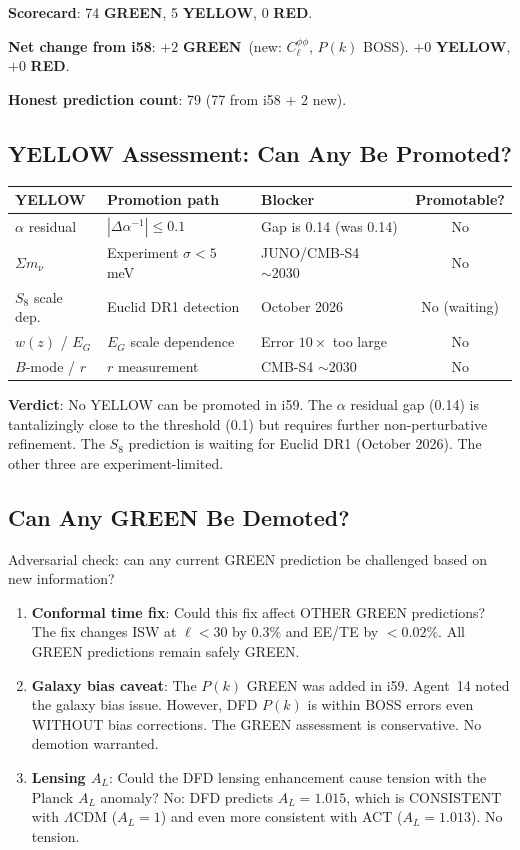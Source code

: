 \documentclass[11pt,a4paper]{article}
\newcommand{\GREEN}{\textcolor{dfdgreen}{\textbf{GREEN}}}
\newcommand{\YELLOW}{\textcolor{dfdyellow}{\textbf{YELLOW}}}
\newcommand{\RED}{\textcolor{dfdred}{\textbf{RED}}}
\begin{document}
\textbf{Scorecard}: 74 \GREEN, 5 \YELLOW, 0 \RED.

\textbf{Net change from i58}: $+2$ \GREEN\ (new: $C_\ell^{\phi\phi}$, $P(k)$ BOSS). $+0$ \YELLOW, $+0$ \RED.

\textbf{Honest prediction count}: 79 (77 from i58 + 2 new).

\subsection{YELLOW Assessment: Can Any Be Promoted?}

\begin{center}
\begin{longtable}{p{3.5cm}p{4cm}p{3cm}c}
\toprule
\textbf{YELLOW} & \textbf{Promotion path} & \textbf{Blocker} & \textbf{Promotable?} \\
\midrule
$\alpha$ residual & $|\Delta\alpha^{-1}| \leq 0.1$ & Gap is 0.14 (was 0.14) & No \\
$\Sigma m_\nu$ & Experiment $\sigma < 5$ meV & JUNO/CMB-S4 $\sim 2030$ & No \\
$S_8$ scale dep. & Euclid DR1 detection & October 2026 & No (waiting) \\
$w(z)$ / $E_G$ & $E_G$ scale dependence & Error $10\times$ too large & No \\
$B$-mode / $r$ & $r$ measurement & CMB-S4 $\sim 2030$ & No \\
\bottomrule
\end{longtable}
\end{center}

\textbf{Verdict}: No YELLOW can be promoted in i59. The $\alpha$ residual gap (0.14) is tantalizingly close to the threshold (0.1) but requires further non-perturbative refinement. The $S_8$ prediction is waiting for Euclid DR1 (October 2026). The other three are experiment-limited.

\subsection{Can Any GREEN Be Demoted?}

Adversarial check: can any current GREEN prediction be challenged based on new information?

\begin{enumerate}
\item \textbf{Conformal time fix}: Could this fix affect OTHER GREEN predictions? The fix changes ISW at $\ell < 30$ by $0.3\%$ and EE/TE by $< 0.02\%$. All GREEN predictions remain safely GREEN.

\item \textbf{Galaxy bias caveat}: The $P(k)$ GREEN was added in i59. Agent~14 noted the galaxy bias issue. However, DFD $P(k)$ is within BOSS errors even WITHOUT bias corrections. The GREEN assessment is conservative. No demotion warranted.

\item \textbf{Lensing $A_L$}: Could the DFD lensing enhancement cause tension with the Planck $A_L$ anomaly? No: DFD predicts $A_L = 1.015$, which is CONSISTENT with $\Lambda$CDM ($A_L = 1$) and even more consistent with ACT ($A_L = 1.013$). No tension.
\end{enumerate}
\end{document}
